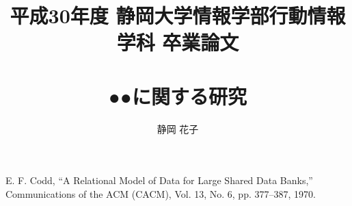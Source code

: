 \documentclass[a4paper,10pt,oneside,openany,autodetect-engine,dvipdfmx,platex]{jsreport}
\newcommand{\ChangeHeaderRule}{%
     \let\section\chapter
     \let\subsection\section
}
\begin{document}
\ChangeHeaderRule
\title{平成30年度 静岡大学情報学部行動情報学科 卒業論文\\ \ \\
●●に関する研究}
\author{静岡 花子}

\begin{abstract}

\end{abstract}


\maketitle

















\vspace{2em}

\begin{thebibliography}{99}
  E. F. Codd,
  ``A Relational Model of Data for Large Shared Data Banks,''
  Communications of the {ACM} (CACM), Vol. 13, No. 6, pp. 377--387, 1970.
\end{thebibliography}
\end{document}
